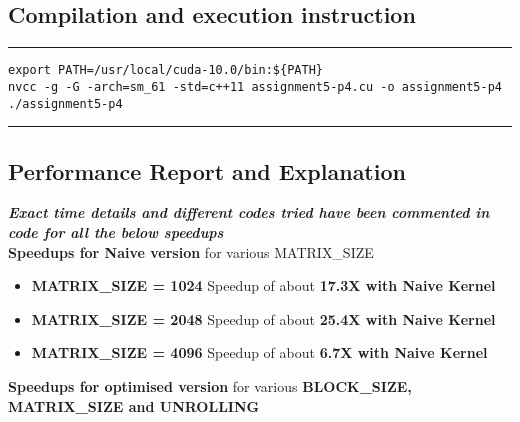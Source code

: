\documentclass[a4paper]{article}
\begin{document}
\subsection{Compilation and execution instruction }
\vspace{0.3cm}
\hrule
\begin{lstlisting}
export PATH=/usr/local/cuda-10.0/bin:${PATH}
nvcc -g -G -arch=sm_61 -std=c++11 assignment5-p4.cu -o assignment5-p4
./assignment5-p4
\end{lstlisting}
\hrule 
\vspace{0.5cm}

\subsection{Performance Report and Explanation}
{\bf \emph{Exact time details and different codes tried have been commented in code for all the below speedups}}\\
\newline
{\bf Speedups for Naive version} for various MATRIX\_SIZE
\begin{itemize}
\item {\bf MATRIX\_SIZE = 1024} Speedup of about {\bf 17.3X with Naive Kernel}
\item {\bf MATRIX\_SIZE = 2048} Speedup of about {\bf 25.4X with Naive Kernel}
\item {\bf MATRIX\_SIZE = 4096} Speedup of about {\bf 6.7X with Naive Kernel}
\end{itemize}
{\bf Speedups for optimised version} for various {\bf BLOCK\_SIZE, MATRIX\_SIZE and UNROLLING}
\end{document}
